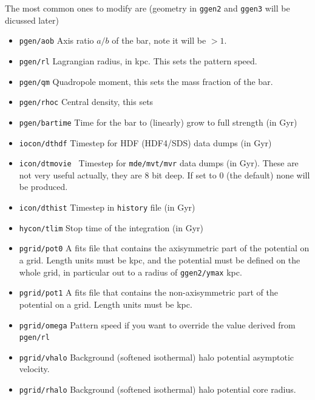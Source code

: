 \documentclass[10pt,dvips]{article}
\begin{document}
The most common ones to modify are (geometry in {\tt ggen2} and {\tt ggen3}
will be dicussed later)

\begin{itemize}

\item
{\tt pgen/aob}
Axis ratio $a/b$ of the bar, note it will be $> 1$.

\item
{\tt pgen/rl}
Lagrangian radius, in kpc. This sets the pattern speed.

\item
{\tt pgen/qm}
Quadropole moment, this sets the mass fraction of the bar.

\item
{\tt pgen/rhoc}
Central density, this sets 

\item
{\tt pgen/bartime}
Time for the bar to (linearly) grow to full strength (in Gyr)

\item
{\tt iocon/dthdf}
Timestep for HDF (HDF4/SDS) data dumps (in Gyr)

\item
{\tt icon/dtmovie }
Timestep for {\tt mde/mvt/mvr} data dumps (in Gyr). These are
not very useful actually, they are 8 bit deep. If set to 0
(the default) none will be produced.

\item
{\tt icon/dthist}
Timestep in {\tt history} file (in Gyr)

\item
{\tt hycon/tlim}
Stop time of the integration (in Gyr)


\item
{\tt pgrid/pot0}
A fits file that contains the axisymmetric part of the potential
on a grid.
Length units must be kpc, and the potential must be defined
on the whole grid, in particular out
to a radius of {\tt ggen2/ymax} kpc.

\item
{\tt pgrid/pot1}
A fits file that contains the non-axisymmetric part of the potential
on a grid.
Length units must be kpc.

\item
{\tt pgrid/omega}
Pattern speed if you want to override the value derived from {\tt pgen/rl}

\item
{\tt pgrid/vhalo}
Background (softened isothermal) halo potential asymptotic velocity.

\item
{\tt pgrid/rhalo}
Background (softened isothermal) halo potential core radius.


\end{itemize}
\end{document}
